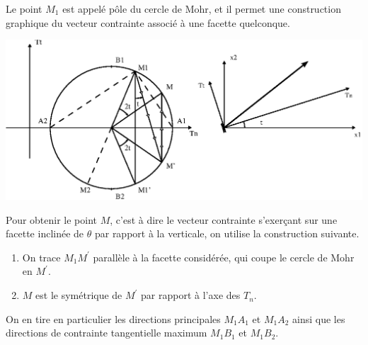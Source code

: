 Le point $M_1$ est appelé pôle du cercle de Mohr, et il permet une construction graphique du vecteur contrainte associé à une facette quelconque.
\begin{center}
    \includegraphics{../images/T1_Ch02-0018}
\end{center}
Pour obtenir le point $M$, c'est à dire le vecteur contrainte s'exerçant sur une facette inclinée de $\theta$ par rapport à la verticale, on utilise la construction suivante.
\begin{enumerate}
    \item On trace $M_1 M^{\prime}$ parallèle à la facette considérée, qui coupe le cercle de Mohr en $M^{\prime}$.
    \item $M$ est le symétrique de $M^{\prime}$ par rapport à l'axe des $T_n$.
\end{enumerate}
On en tire en particulier les directions principales $M_1 A_1$ et $M_1 A_2$ ainsi que les directions de contrainte tangentielle maximum $M_1 B_1$ et $M_1 B_2$. 

